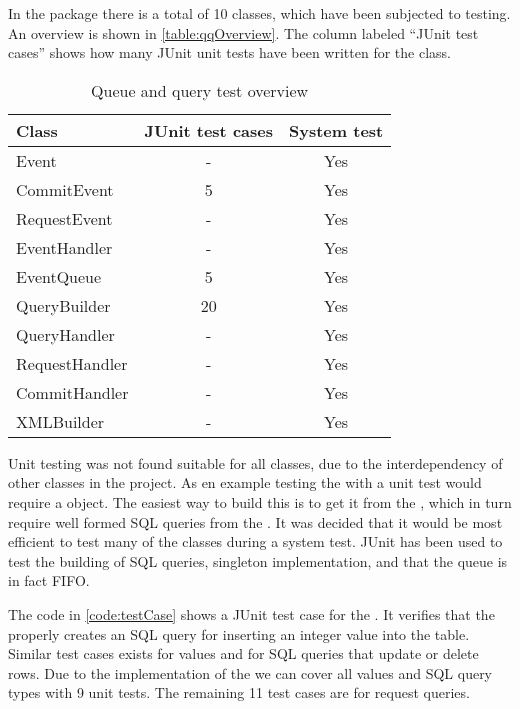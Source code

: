 In the  package there is a total of 10 classes, which have been subjected to testing. An overview is shown in \autoref{table:qqOverview}.
The column labeled ``JUnit test cases'' shows how many JUnit unit tests have been written for the class.

\begin{table}[H]
  \begin{center}
  \begin{tabular}{l|c|c}
    Class          & JUnit test cases & System test\\
\hline
    Event          & -                &Yes\\
    CommitEvent    & 5                &Yes\\
    RequestEvent   & -                &Yes\\
    EventHandler   & -                &Yes\\
    EventQueue     & 5                &Yes\\
    QueryBuilder   & 20               &Yes\\
    QueryHandler   & -                &Yes\\
    RequestHandler & -                &Yes\\
    CommitHandler  & -                &Yes\\
    XMLBuilder     & -                &Yes\\
  \end{tabular}
  \caption{Queue and query test overview}
  \label{table:qqOverview}
  \end{center}
\end{table}

Unit testing was not found suitable for all classes, due to the interdependency of other classes in the project. As en example testing the  with a unit test would require
a  object. The easiest way to build this is to get it from the , which in turn require well formed SQL queries from the .
It was decided that it would be most efficient to test many of the classes during a system test. JUnit has been used to test the building of SQL queries, singleton implementation,
and that the queue is in fact FIFO. 

The code in \autoref{code:testCase} shows a JUnit test case for the . It verifies that the  properly creates an SQL query for inserting an integer value
into the  table. Similar test cases exists for  values and for SQL queries that update or delete rows.
Due to the implementation of the  we can cover all values and SQL query types with 9 unit tests. The remaining 11 test cases are for request queries.

